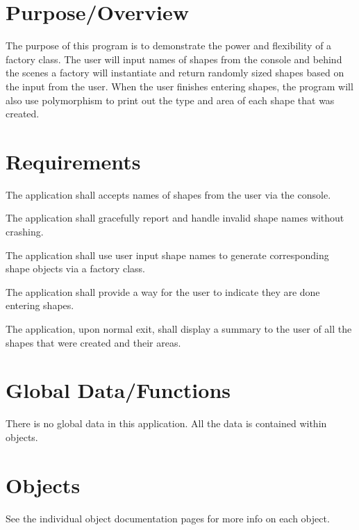 \hypertarget{index_purpose}{}\section{Purpose/\+Overview}\label{index_purpose}
The purpose of this program is to demonstrate the power and flexibility of a factory class. The user will input names of shapes from the console and behind the scenes a factory will instantiate and return randomly sized shapes based on the input from the user. When the user finishes entering shapes, the program will also use polymorphism to print out the type and area of each shape that was created.\hypertarget{index_reqs}{}\section{Requirements}\label{index_reqs}
The application shall accepts names of shapes from the user via the console.

The application shall gracefully report and handle invalid shape names without crashing.

The application shall use user input shape names to generate corresponding shape objects via a factory class.

The application shall provide a way for the user to indicate they are done entering shapes.

The application, upon normal exit, shall display a summary to the user of all the shapes that were created and their areas.\hypertarget{index_globals}{}\section{Global Data/\+Functions}\label{index_globals}
There is no global data in this application. All the data is contained within objects.\hypertarget{index_objects}{}\section{Objects}\label{index_objects}
See the individual object documentation pages for more info on each object.

